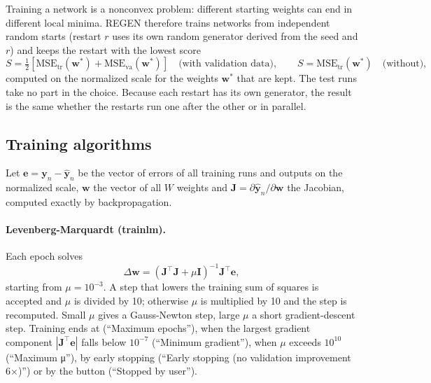 Training a network is a nonconvex problem: different starting weights can end in different local minima. REGEN
therefore trains  networks from independent random starts (restart $r$ uses its
own random generator derived from the seed and $r$) and keeps the restart with the lowest score
\begin{equation}
  S = \tfrac{1}{2}\left[\text{MSE}_\text{tr}(\mathbf{w}^*) + \text{MSE}_\text{va}(\mathbf{w}^*)\right]
  \quad\text{(with validation data)}, \qquad S = \text{MSE}_\text{tr}(\mathbf{w}^*) \quad\text{(without)},
  \label{eq:ch07-score}
\end{equation}
computed on the normalized scale for the weights $\mathbf{w}^*$ that are kept. The test runs take no part in the
choice. Because each restart has its own generator, the result is the same whether the restarts run one after
the other or in parallel.

\subsection{Training algorithms}\label{sec:ch07-algorithms}

Let $\mathbf{e} = \mathbf{y}_n - \hat{\mathbf{y}}_n$ be the vector of errors of all training runs and outputs on
the normalized scale, $\mathbf{w}$ the vector of all $W$ weights and $\mathbf{J} = \partial\hat{\mathbf{y}}_n /
\partial\mathbf{w}$ the Jacobian, computed exactly by backpropagation.

\paragraph{Levenberg-Marquardt (trainlm).} Each epoch solves \citep{hagan1994}
\begin{equation}
  \Delta\mathbf{w} = \left(\mathbf{J}^\top\mathbf{J} + \mu\mathbf{I}\right)^{-1}\mathbf{J}^\top\mathbf{e},
  \label{eq:ch07-lm}
\end{equation}
starting from $\mu = 10^{-3}$. A step that lowers the training sum of squares is accepted and $\mu$ is divided by
10; otherwise $\mu$ is multiplied by 10 and the step is recomputed. Small $\mu$ gives a Gauss-Newton step, large
$\mu$ a short gradient-descent step. Training ends at  (``Maximum epochs''), when the largest
gradient component $|\mathbf{J}^\top\mathbf{e}|$ falls below $10^{-7}$ (``Minimum gradient''), when $\mu$ exceeds
$10^{10}$ (``Maximum μ''), by early stopping (``Early stopping (no validation improvement 6×)'') or by the
 button (``Stopped by user'').

